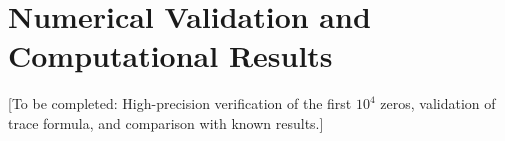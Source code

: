\section{Numerical Validation and Computational Results}

[To be completed: High-precision verification of the first $10^4$ zeros, validation of trace formula, and comparison with known results.]
